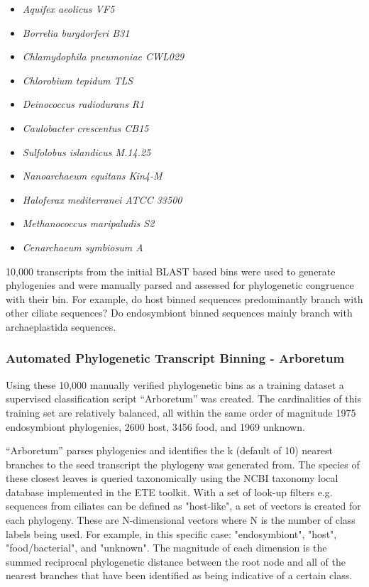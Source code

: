 \begin{itemize}
    \item \textit{Aquifex aeolicus VF5}
    \item \textit{Borrelia burgdorferi B31}
    \item \textit{Chlamydophila pneumoniae CWL029}
    \item \textit{Chlorobium tepidum TLS}
    \item \textit{Deinococcus radiodurans R1}
    \item \textit{Caulobacter crescentus CB15}
    \item \textit{Sulfolobus islandicus M.14.25}
    \item \textit{Nanoarchaeum equitans Kin4-M}
    \item \textit{Haloferax mediterranei ATCC 33500}
    \item \textit{Methanococcus maripaludis S2}
    \item \textit{Cenarchaeum symbiosum A}
\end{itemize}

10,000 transcripts from the initial BLAST based bins were used to generate phylogenies 
and were manually parsed and assessed for phylogenetic congruence with their bin.
For example, do host binned sequences predominantly branch with other ciliate sequences?
Do endosymbiont binned sequences mainly branch with archaeplastida sequences. 



\subsubsection{Automated Phylogenetic Transcript Binning - Arboretum}

Using these 10,000 manually verified phylogenetic bins as a training dataset a supervised classification
script ``Arboretum'' was created.  The cardinalities of this training set are relatively balanced, all within
the same order of magnitude 1975 endosymbiont phylogenies, 2600 host, 3456 food, and 1969
unknown. 


``Arboretum'' parses phylogenies and identifies the k (default of 10) nearest branches to the seed transcript
the phylogeny was generated from.  The species of these closest leaves is queried taxonomically using the
NCBI taxonomy local database implemented in the ETE toolkit.  With a set of look-up filters e.g.
sequences from ciliates can be defined as "host-like", a set of vectors is created for each phylogeny.  
These are N-dimensional vectors where N is the number of class labels being used. 
For example, in this specific case: "endosymbiont", "host", "food/bacterial", and "unknown".
The magnitude of each dimension is the summed reciprocal phylogenetic distance between the root node and all
of the nearest branches that have been identified as being indicative of a certain class.

